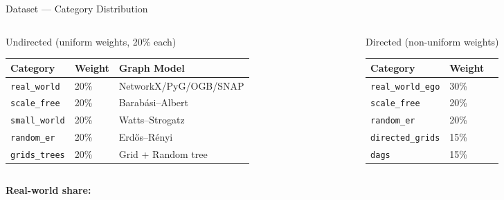 \documentclass[aspectratio=169,10pt]{beamer}
\renewcommand{\footnotesize}{\tiny}
\begin{document}
\begin{frame}{Dataset — Category Distribution}
  \begin{columns}[T]
    \begin{column}{0.50\textwidth}
      \begin{block}{Undirected (uniform weights, 20\% each)}
        \begin{tabular}{lll}
          \toprule
          Category & Weight & Graph Model\\
          \midrule
          \texttt{real\_world}  & 20\% & NetworkX/PyG/OGB/SNAP\\
          \texttt{scale\_free}  & 20\% & Barabási–Albert \cite{barabasi1999}\\
          \texttt{small\_world} & 20\% & Watts–Strogatz \cite{watts1998}\\
          \texttt{random\_er}   & 20\% & Erdős–Rényi \cite{erdos1959}\\
          \texttt{grids\_trees} & 20\% & Grid + Random tree\\
          \bottomrule
        \end{tabular}
      \end{block}
    \end{column}
    \begin{column}{0.46\textwidth}
      \begin{block}{Directed (non-uniform weights)}
        \begin{tabular}{lll}
          \toprule
          Category & Weight\\
          \midrule
          \texttt{real\_world\_ego}  & 30\%\\
          \texttt{scale\_free}       & 20\%\\
          \texttt{random\_er}        & 20\%\\
          \texttt{directed\_grids}   & 15\%\\
          \texttt{dags}              & 15\%\\
          \bottomrule
        \end{tabular}
      \end{block}
    \end{column}
  \end{columns}
  \vspace{6pt}
  \begin{columns}[T]
    \begin{column}{0.50\textwidth}
      \begin{tcolorbox}[greenbox,fontupper=\footnotesize]
        \textbf{Real-world share:}\\

\end{tcolorbox}
\end{column}
\end{columns}
\end{frame}
\end{document}
